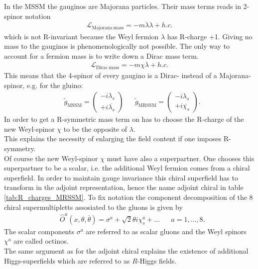 In the MSSM the gauginos are Majorana particles. Their mass terms  reads in 2-spinor notation
\begin{align}
\mathcal{L}_{\mathrm{Majorana\ mass}} = -m\lambda\lambda + h.c.
\end{align}
which is not R-invariant because the Weyl fermion $\lambda$ has R-charge +1. Giving no mass to the gauginos is phenomenologically not possible. The only way to account for a fermion mass is to write down a Dirac mass term.
\begin{align}
\mathcal{L}_{\mathrm{Dirac\ mass}} = -m \chi\lambda + h.c.
\end{align}
This means that the 4-spinor of every gaugino is a Dirac- instead of a Majorana-spinor, e.g. for the gluino:
\begin{align}
& \tilde{g}_\mathrm{MSSM} = \begin{pmatrix}
-i \lambda_s \\
+i \overline{\lambda_s}
\end{pmatrix} && \tilde{g}_\mathrm{MRSSM} = \begin{pmatrix}
-i \lambda_s \\
+i \overline{\chi_s}
\end{pmatrix}.
\end{align}
In order to get a R-symmetric mass term on has to choose the R-charge of the new Weyl-spinor $\chi$ to be the opposite of $\lambda$.\\
This explains the necessity of enlarging the field content if one imposes R-symmetry.\\
Of course the new Weyl-spinor $\chi$ must have also a superpartner. One chooses this superpartner to be a scalar, i.e. the additional Weyl fermion comes from a chiral superfield. In order to maintain gauge invariance this chiral superfield has to transform in the adjoint representation, hence the name adjoint chiral in table \ref{tab:R_charges_MRSSM}. To fix notation the component decomposition of the 8 chiral supermultipletts assosiated to the gluons is given by
\begin{align}
&\hat{O}^a(x, \theta, \overline{\theta}) = \sigma^a + \sqrt{2}\theta i\chi^a_s + \hdots && a = 1,\hdots,8.
\end{align}
The scalar components $\sigma^a$ are referred to as scalar gluons and the Weyl spinors $\chi^a$ are called octinos.\\
The same argument as for the adjoint chiral explains the existence of additional Higgs-superfields which are referred to as $R$-Higgs fields.\\
